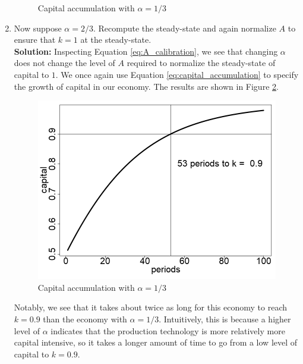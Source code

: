 \documentclass[10pt,letter]{article}
\begin{document}
\begin{enumerate}
\begin{figure}[!htb]
    	\caption{Capital accumulation with $\alpha = 1/3$}
    	\label{fig:cap_accumulation_alpha_low}
    \end{figure}
	\item Now suppose $\alpha = 2/3$. Recompute the steady-state and again normalize $A$ to ensure that $k=1$ at the steady-state. \\
	
	\noindent\textbf{Solution:} Inspecting Equation \ref{eq:A_calibration}, we see that changing $\alpha$ does not change the level of $A$ required to normalize the steady-state of capital to $1$. We once again use Equation \ref{eq:capital_accumulation} to specify the growth of capital in our economy. The results are shown in Figure \ref{fig:cap_accumulation_alpha_high}.
	\begin{figure}[!htb]
		\centering
		\includegraphics[width=0.5\linewidth]{solow_growth_alpha_high.png}
		\caption{Capital accumulation with $\alpha = 1/3$}
		\label{fig:cap_accumulation_alpha_high}
	\end{figure} 
	Notably, we see that it takes about twice as long for this economy to reach $k=0.9$ than the economy with $\alpha = 1/3$. Intuitively, this is because a higher level of $\alpha$ indicates that the production technology is more relatively more capital intensive, so it takes a longer amount of time to go from a low level of capital to $k=0.9$. 
\end{enumerate}




%
\end{document}
